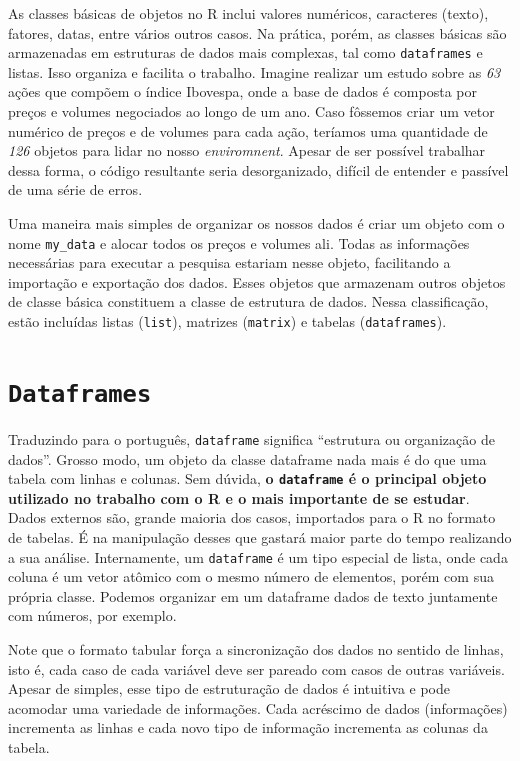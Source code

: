 \documentclass[
  11pt,
]{book}
\begin{document}
As classes básicas de objetos no R inclui valores numéricos, caracteres (texto), fatores, datas, entre vários outros casos. Na prática, porém, as classes básicas são armazenadas em estruturas de dados mais complexas, tal como \texttt{dataframes} e listas. Isso organiza e facilita o trabalho. Imagine realizar um estudo sobre as \emph{63} ações que compõem o índice Ibovespa, onde a base de dados é composta por preços e volumes negociados ao longo de um ano. Caso fôssemos criar um vetor numérico de preços e de volumes para cada ação, teríamos uma quantidade de \emph{126} objetos para lidar no nosso \emph{enviromnent}. Apesar de ser possível trabalhar dessa forma, o código resultante seria desorganizado, difícil de entender e passível de uma série de erros.

Uma maneira mais simples de organizar os nossos dados é criar um objeto com o nome \texttt{my\_data} e alocar todos os preços e volumes ali. Todas as informações necessárias para executar a pesquisa estariam nesse objeto, facilitando a importação e exportação dos dados. Esses objetos que armazenam outros objetos de classe básica constituem a classe de estrutura de dados. Nessa classificação, estão incluídas listas (\texttt{list}), matrizes (\texttt{matrix}) e tabelas (\texttt{dataframes}).

\hypertarget{dataframes}{%
\section{\texorpdfstring{\texttt{Dataframes}}{Dataframes}}\label{dataframes}}

Traduzindo para o português, \texttt{dataframe} significa ``estrutura ou organização de dados''. Grosso modo, um objeto da classe dataframe nada mais é do que uma tabela com linhas e colunas. Sem dúvida, \textbf{o \texttt{dataframe} é o principal objeto utilizado no trabalho com o R e o mais importante de se estudar}. Dados externos são, grande maioria dos casos, importados para o R no formato de tabelas. É na manipulação desses que gastará maior parte do tempo realizando a sua análise. Internamente, um \texttt{dataframe} é um tipo especial de lista, onde cada coluna é um vetor atômico com o mesmo número de elementos, porém com sua própria classe. Podemos organizar em um dataframe dados de texto juntamente com números, por exemplo.

Note que o formato tabular força a sincronização dos dados no sentido de linhas, isto é, cada caso de cada variável deve ser pareado com casos de outras variáveis. Apesar de simples, esse tipo de estruturação de dados é intuitiva e pode acomodar uma variedade de informações. Cada acréscimo de dados (informações) incrementa as linhas e cada novo tipo de informação incrementa as colunas da tabela.
\end{document}
